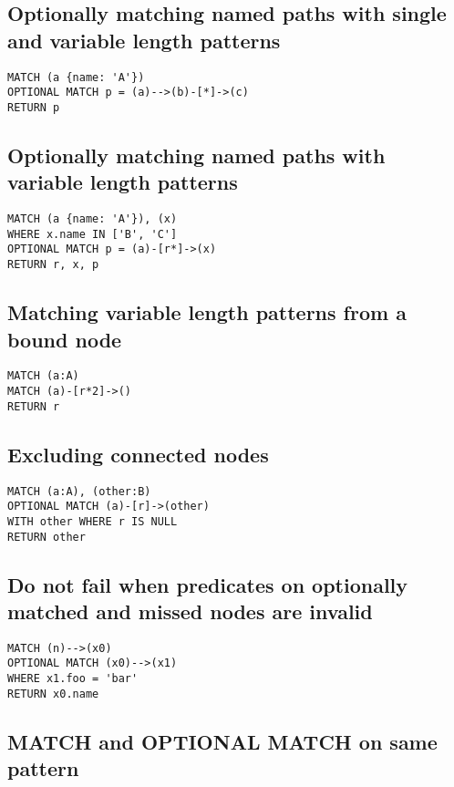 \subsection{Optionally matching named paths with single and variable length patterns}

\begin{lstlisting}
MATCH (a {name: 'A'})
OPTIONAL MATCH p = (a)-->(b)-[*]->(c)
RETURN p
\end{lstlisting}

\subsection{Optionally matching named paths with variable length patterns}

\begin{lstlisting}
MATCH (a {name: 'A'}), (x)
WHERE x.name IN ['B', 'C']
OPTIONAL MATCH p = (a)-[r*]->(x)
RETURN r, x, p
\end{lstlisting}

\subsection{Matching variable length patterns from a bound node}

\begin{lstlisting}
MATCH (a:A)
MATCH (a)-[r*2]->()
RETURN r
\end{lstlisting}

\subsection{Excluding connected nodes}

\begin{lstlisting}
MATCH (a:A), (other:B)
OPTIONAL MATCH (a)-[r]->(other)
WITH other WHERE r IS NULL
RETURN other
\end{lstlisting}

\subsection{Do not fail when predicates on optionally matched and missed nodes are invalid}

\begin{lstlisting}
MATCH (n)-->(x0)
OPTIONAL MATCH (x0)-->(x1)
WHERE x1.foo = 'bar'
RETURN x0.name
\end{lstlisting}

\subsection{MATCH and OPTIONAL MATCH on same pattern}

